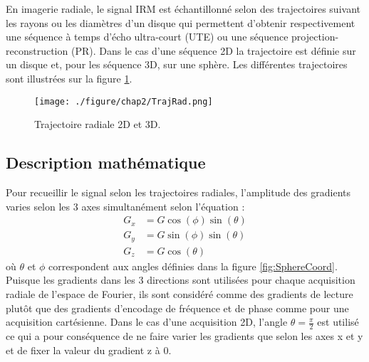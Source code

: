 En imagerie radiale, le signal IRM est échantillonné selon des trajectoires suivant les rayons ou les diamètres d'un disque qui permettent d'obtenir respectivement une séquence à temps d'écho ultra-court (UTE) ou une séquence projection-reconstruction (PR). Dans le cas d'une séquence 2D la trajectoire est définie sur un disque et, pour les séquence 3D, sur une sphère. Les différentes trajectoires sont illustrées sur la figure \ref{fig:TrajRad}.

\begin{figure}[h]
\centering
\texttt{[image: ./figure/chap2/TrajRad.png]}
\caption[Trajectoires Radiales]{\label{fig:TrajRad} Trajectoire radiale 2D et 3D.}
\end{figure}




\subsection{Description mathématique}

Pour recueillir le signal selon les trajectoires radiales, l'amplitude des gradients varies selon les 3 axes simultanément selon l'équation :
\begin{equation}
\label{eq:AngleRadial}
\begin{split}
	G_x & =G\cos(\phi)\sin(\theta)\\
	G_y & =G\sin(\phi)\sin(\theta)\\	
	G_z & =G\cos(\theta)
\end{split}
\end{equation}
où $\theta$ et $\phi$ correspondent aux angles définies dans la figure \ref{fig:SphereCoord}.
Puisque les gradients dans les 3 directions sont utilisées pour chaque acquisition radiale de l'espace de Fourier, ils sont considéré comme des gradients de lecture plutôt que des gradients d'encodage de fréquence et de phase comme pour une acquisition cartésienne. Dans le cas d'une acquisition 2D, l'angle $\theta = \frac{\pi}{2}$ est utilisé ce qui a pour conséquence de ne faire varier les gradients que selon les axes x et y et de fixer la valeur du gradient z à 0.

